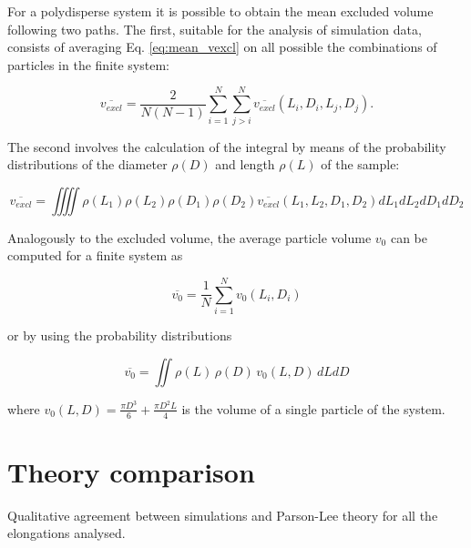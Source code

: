 \documentclass[journal=jacsat,manuscript=article]{achemso}
\begin{document}
For a polydisperse system it is possible to obtain the mean excluded volume following two paths. The first, suitable for the analysis of simulation data, consists of averaging Eq. \ref{eq:mean_vexcl} on all possible the combinations of particles in the finite system:

\begin{equation}\label{Vexcl_poly}
    \overline{v_{excl}} = \frac{2}{N (N-1)} \sum_{i=1} ^N \sum_{j>i}^N \overline{v_{excl}}(L_i, D_i, L_j, D_j).
\end{equation}

The second involves the calculation of the integral by means of the probability distributions of the diameter $\rho(D)$ and length $\rho(L)$ of the sample:

\begin{equation}
    \overline{v_{excl}} = \iiiint \rho(L_1) \rho(L_2) \rho(D_1) \rho(D_2) \overline{v_{excl}}(L_1, L_2, D_1, D_2) dL_1 dL_2 dD_1 dD_2
\end{equation}

Analogously to the excluded volume, the average particle volume $v_0$ can be computed for a finite system as

\begin{equation}
    \overline{v_0} = \frac{1}{N} \sum_{i=1} ^N  v_0(L_i, D_i)
\end{equation}

or by using the probability distributions

\begin{equation}
    \overline{v_0} = \iint \rho(L) \, \rho(D) \, v_0(L, D) \, dL dD
\end{equation}

where $v_0(L, D) = \frac{\pi D^3}{6} + \frac{\pi D^2 L}{4}$ is the volume of a single particle of the system.


\section{Theory comparison}

Qualitative agreement between simulations and Parson-Lee theory for all the elongations analysed.
\end{document}
